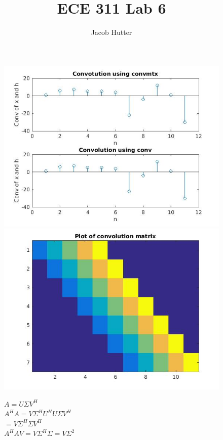 \documentclass{article}
\author{Jacob Hutter}
\title{ECE 311 Lab 6}
\begin{document}
\maketitle

\begin{figure}[H]

\includegraphics[scale=.5]{report1_1}
\includegraphics[scale=.5]{report1_2}
\end{figure}

\begin{figure}[H]
$A = U \Sigma V^H $ 
\\$A^HA = V\Sigma^HU^HU \Sigma V^H $
\\$= V \Sigma^H \Sigma V^H$
\\ $A^HAV= V \Sigma^H \Sigma = V \Sigma^2$
\end{figure}
\end{document}
